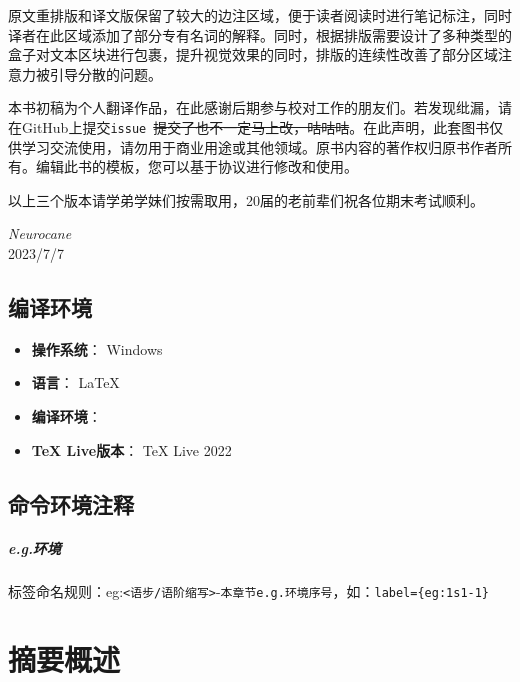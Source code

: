 \documentclass[a4paper]{ctexbook}
\begin{document}
原文重排版和译文版保留了较大的边注区域，便于读者阅读时进行笔记标注，同时译者在此区域添加了部分专有名词的解释。同时，根据排版需要设计了多种类型的盒子对文本区块进行包裹，提升视觉效果的同时，排版的连续性改善了部分区域注意力被引导分散的问题。

本书初稿为个人翻译作品，在此感谢后期参与校对工作的朋友们。若发现纰漏，请在GitHub上提交\verb|issue|~\sout{提交了也不一定马上改，咕咕咕}。在此声明，此套图书仅供学习交流使用，请勿用于商业用途或其他领域。原书内容的著作权归原书作者所有。编辑此书的模板，您可以基于协议进行修改和使用。

以上三个版本请学弟学妹们按需取用，20届的老前辈们祝各位期末考试顺利。

\vfill

\begin{flushright}
    \emph{Neurocane}\\
    2023/7/7
\end{flushright}

\newpage

\section*{编译环境}

\begin{itemize}
    \item \textbf{操作系统}： Windows
    \item \textbf{语言}： \LaTeX
    \item \textbf{编译环境}： \XeLaTeX
    \item \textbf{TeX Live版本}： TeX Live 2022
\end{itemize}

\section*{命令环境注释}

\paragraph*{e.g.环境} 标签命名规则：eg:\verb|<语步/语阶缩写>|-\verb|本章节e.g.环境序号|，如：\verb|label={eg:1s1-1}|

\tableofcontents

\mainmatter


\chapter{摘要概述}\label{chapter1}
\end{document}
